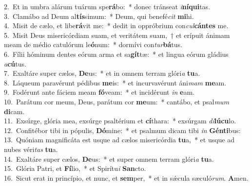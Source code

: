 {2.~}Et in umbra alárum tuárum spe\textbf{rá}bo:~* donec tránseat \textit{i}\textbf{ní}\textbf{qui}tas.\\
{3.~}Clamábo ad Deum al\textbf{tís}simum:~* Deum, qui benefé\textit{cit} \textbf{mi}hi.\\
{4.~}Misit de cælo, et libe\textbf{rá}vit me:~* dedit in oppróbrium con\textit{cul}\textbf{cán}\textbf{tes} me.\\
{5.~}Misit Deus misericórdiam suam, et veritátem suam,~† et erípuit ánimam meam de médio catulórum le\textbf{ó}num:~* dormívi con\textit{tur}\textbf{bá}tus.\\
{6.~}Fílii hóminum dentes eórum arma et sa\textbf{gít}tæ:~* et lingua eórum gládius \textit{a}\textbf{cú}tus.\\
{7.~}Exaltáre super cælos, \textbf{De}us:~* et in omnem terram glóri\textit{a} \textbf{tu}a.\\
{8.~}Láqueum paravérunt pédibus \textbf{me}is:~* et incurvavérunt áni\textit{mam} \textbf{me}am.\\
{9.~}Fodérunt ante fáciem meam \textbf{fó}veam:~* et incidérunt \textit{in} \textbf{e}am.\\
{10.~}Parátum cor meum, Deus, parátum cor \textbf{me}um:~* cantábo, et psal\textit{mum} \textbf{di}cam.\\
{11.~}Exsúrge, glória mea, exsúrge psaltérium et \textbf{cí}thara:~* exsúrgam \textit{di}\textbf{lú}\textbf{cu}lo.\\
{12.~}Confitébor tibi in pópulis, \textbf{Dó}mine:~* et psalmum dicam tibi \textit{in} \textbf{Gén}\textbf{ti}bus:\\
{13.~}Quóniam magnificáta est usque ad cælos misericórdia \textbf{tu}a,~* et usque ad nubes véri\textit{tas} \textbf{tu}a.\\
{14.~}Exaltáre super cælos, \textbf{De}us:~* et super omnem terram glóri\textit{a} \textbf{tu}a.\\
{15.~}Glória Patri, et \textbf{Fí}lio,~* et Spirítu\textit{i} \textbf{San}cto.\\
{16.~}Sicut erat in princípio, et nunc, et \textbf{sem}per,~* et in sǽcula sæculó\textit{rum}. \textbf{A}men.\\
